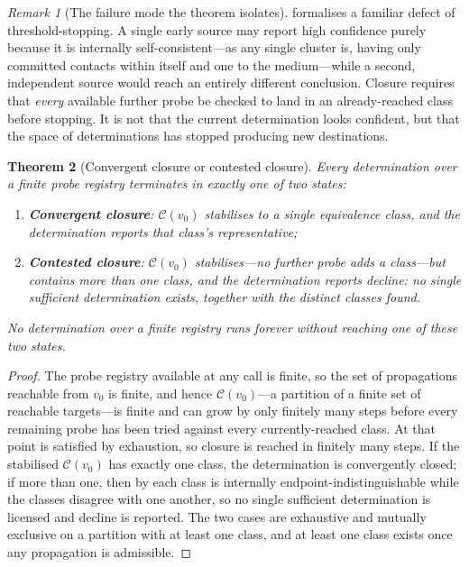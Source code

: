 \documentclass[11pt,twocolumn,a4paper]{article}
\theoremstyle{dirthm}
\newtheorem{theorem}{Theorem}[section]
\theoremstyle{definition}
\theoremstyle{remark}
\newtheorem{remark}[theorem]{Remark}
\newcommand{\Cell}{\mathcal{C}}
\begin{document}
\begin{remark}[The failure mode the theorem isolates]
\label{rem:closure-failure}
 formalises a familiar defect of
threshold-stopping. A single early source may report high confidence purely
because it is internally self-consistent---as any single cluster is, having
only committed contacts within itself and one to the medium---while a second,
independent source would reach an entirely different conclusion. Closure
requires that \emph{every} available further probe be checked to land in an
already-reached class before stopping. It is not that the current
determination looks confident, but that the space of determinations has
stopped producing new destinations.
\end{remark}

\begin{theorem}[Convergent closure or contested closure]
\label{thm:decline}
Every determination over a finite probe registry terminates in exactly one of
two states:
\begin{enumerate}[label=\textup{(\roman*)},leftmargin=2.0em,itemsep=2pt]
\item \textbf{Convergent closure}: $\Cell(v_0)$ stabilises to a single
equivalence class, and the determination reports that class's representative;
\item \textbf{Contested closure}: $\Cell(v_0)$ stabilises---no further probe
adds a class---but contains more than one class, and the determination
reports \emph{decline}: no single sufficient determination exists, together
with the distinct classes found.
\end{enumerate}
No determination over a finite registry runs forever without reaching one of
these two states.
\end{theorem}

\begin{proof}
The probe registry available at any call is finite, so the set of
propagations reachable from $v_0$ is finite, and hence $\Cell(v_0)$---a
partition of a finite set of reachable targets---is finite and can grow by
only finitely many steps before every remaining probe has been tried against
every currently-reached class. At that point  is satisfied
by exhaustion, so closure is reached in finitely many steps. If the
stabilised $\Cell(v_0)$ has exactly one class, the determination is
convergently closed; if more than one, then by  each class is
internally endpoint-indistinguishable while the classes disagree with one
another, so no single sufficient determination is licensed and decline is
reported. The two cases are exhaustive and mutually exclusive on a partition
with at least one class, and at least one class exists once any propagation is
admissible.
\end{proof}
\end{document}

